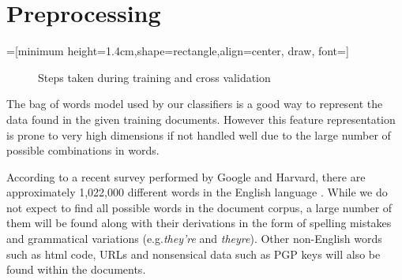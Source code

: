 \section{Preprocessing}
=[minimum height=1.4cm,shape=rectangle,align=center, draw, font=\small]
\begin{figure}[t]
    \caption{Steps taken during training and cross validation}
    \label{fig:steps}
\end{figure}

The bag of words model used by our classifiers is a good way to represent the data found in the given training documents. However this feature representation is prone to very high dimensions if not handled well due to the large number of possible combinations in words. 

According to a recent survey performed by Google and Harvard, there are approximately 1,022,000 different words in the English language \cite{google2010words}. While we do not expect to find all possible words in the document corpus, a large number of them will be found along with their derivations in the form of spelling mistakes and grammatical variations (e.g.{\it they're} and {\it theyre}). Other non-English words such as html code, URLs and nonsensical data such as PGP keys will also be found within the documents.

